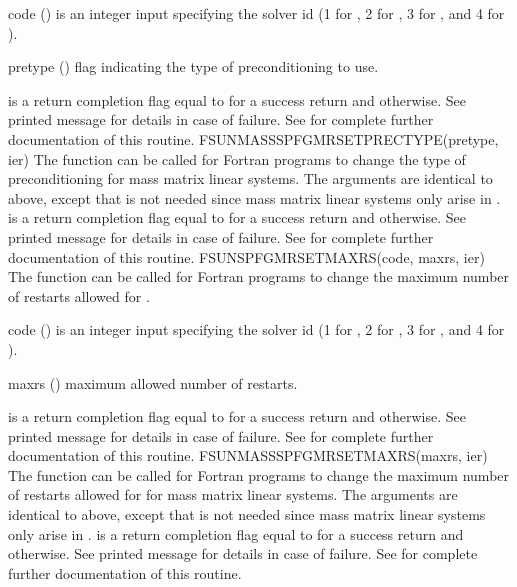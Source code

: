 {
  \begin{args}[pretype]
  \item[code] ()
    is an integer input specifying the solver id (1 for {\cvode}, 2
    for {\ida}, 3 for {\kinsol}, and 4 for {\arkode}).
  \item[pretype] ()
    flag indicating the type of preconditioning to use.
  \end{args}
}
{
   is a  return completion flag equal to  for a success
  return and  otherwise. See printed message for details in case
  of failure.
}
{
  See  for complete further documentation of
  this routine.
}
%
%
{
  FSUNMASSSPFGMRSETPRECTYPE(pretype, ier)
}
{
  The function  can be called for Fortran
  programs to change the type of preconditioning for mass matrix
  linear systems.
}
{
  The arguments are identical to  above, except that
   is not needed since mass matrix linear systems only arise
  in {\arkode}.
}
{
   is a  return completion flag equal to  for a success
  return and  otherwise. See printed message for details in case
  of failure.
}
{
  See  for complete further documentation of
  this routine.
}
%
%
{
  FSUNSPFGMRSETMAXRS(code, maxrs, ier)
}
{
  The function  can be called for Fortran programs
  to change the maximum number of restarts allowed for {\spfgmr}.
}
{
  \begin{args}[maxrs]
  \item[code] ()
    is an integer input specifying the solver id (1 for {\cvode}, 2
    for {\ida}, 3 for {\kinsol}, and 4 for {\arkode}).
  \item[maxrs] ()
    maximum allowed number of restarts.
  \end{args}
}
{
   is a  return completion flag equal to  for a success
  return and  otherwise. See printed message for details in case
  of failure.
}
{
  See  for complete further
  documentation of this routine.
}
%
%
{
  FSUNMASSSPFGMRSETMAXRS(maxrs, ier)
}
{
  The function  can be called for Fortran
  programs to change the maximum number of restarts allowed for
  {\spfgmr} for mass matrix linear systems.
}
{
  The arguments are identical to  above, except that
   is not needed since mass matrix linear systems only arise
  in {\arkode}.
}
{
   is a  return completion flag equal to  for a success
  return and  otherwise. See printed message for details in case
  of failure.
}
{
  See  for complete further
  documentation of this routine.
}
%
%

